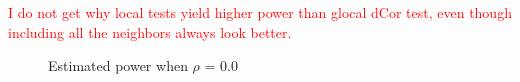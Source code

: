 \documentclass[12pt]{report}
\begin{document}
\textcolor{red}{I do not get why local tests yield higher power than glocal dCor test, even though including all the neighbors always look better.}





\begin{figure}[H]
\captionsetup{format=plain}
\centering
{}
\caption{Estimated power when $\rho$ = 0.0}
\label{fig:power0}    
\end{figure} 
\end{document}
